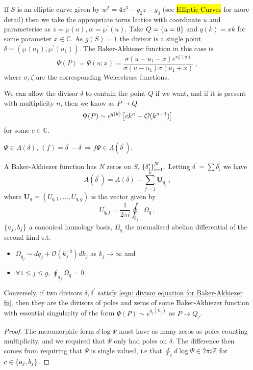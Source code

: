 \documentclass{article}
\begin{document}
\begin{example}
	If $S$ is an elliptic curve given by $w^2=4z^3-g_2z-g_3$ (see \hl{Elliptic Curves} for more detail) then we take the appropriate torus lattice with coordinate $u$ and parameterise as $z=\wp(u), w=\wp^\prime(u)$. Take $Q = \left\{ u=0 \right\}$ and $q(k)=xk$ for some parameter $x \in \mathbb{C}$. As $g(S)=1$ the divisor is a single point $\delta=(\wp(u_1),\wp^\prime(u_1))$. The Baker-Akhiezer function in this case is 
	\[
	\Psi(P) = \Psi(u;x) = \frac{\sigma(u-u_1-x)e^{x\zeta(u)}}{\sigma(u-u_1)\sigma(u_1+x)} \, ,
	\]
	where $\sigma, \zeta$ are the corresponding Weierstrass functions. 
\end{example}

\begin{remark}
	We can allow the divisor $\delta$ to contain the point $Q$ if we want, and if it is present with multiplicity $n$, then we know as $P\to Q$ 
	\[
	\Psi(P) \sim e^{q(k)}\left[ ck^n + \mathcal{O}(k^{n-1}) \right]
	\]
	for some $c \in \mathbb{C}$. 
\end{remark}

\begin{prop}
	$\Psi \in \Lambda(\delta), \, (f)=\delta^\prime-\delta \, \Rightarrow f\Psi \in \Lambda(\delta^\prime)$.  
\end{prop}

\begin{lemma}\label{lemma: zeros of the Baker-Ahkiezer fn}
	A Baker-Akhiezer function has $N$ zeros on $S$, $\left\{ \delta_i^\prime \right\}_{i=1}^N$. Letting $\delta^\prime = \sum \delta_i^\prime$ we have 
	\begin{equation}\label{eqn: divisor equation for Baker-Akhiezer fn}
	A(\delta^\prime) = A(\delta) - \sum_{j=1}^n \bm{U}_{q_j} \, ,
	\end{equation}
	where $\bm{U}_q = (U_{q,1}, \dots, U_{q,g})$ is the vector given by 
	\[
	U_{q,j} = \frac{1}{2\pi i} \oint_{b_j} \Omega_q\, ,
	\] 
	$\left\{ a_j,b_j \right\}$ a canonical homology basis, $\Omega_q$ the normalised abelian differential of the second kind s.t. 
	\begin{itemize}
		\item $\Omega_{q_j} \sim dq_j + \mathcal{O}(k_j^{-2})dk_j$ as $k_j \to \infty$ and 
		\item $\forall 1 \leq j \leq g, \, \oint_{a_j} \Omega_q =0$. 
	\end{itemize}
	Conversely, if two divisors $\delta, \delta^\prime$ satisfy \ref{eqn: divisor equation for Baker-Akhiezer fn}, then they are the divisors of poles and zeros of some Baker-Akhiezer function with essential singularity of the form $\Psi(P) \sim e^{q_j(k_j)}$ as $P \to Q_j$.
\end{lemma}
\begin{proof}
	The meromorphic form $d\log \Psi$ must have as many zeros as poles counting multiplicity, and we required that $\Psi$ only had poles on $\delta$. The difference then comes from requiring that $\Psi$ is single valued, i.e that $\oint_c d\log\Psi \in 2\pi i \mathbb{Z}$ for $c \in \left\{ a_j, b_j \right\}$. 
\end{proof}
\end{document}
